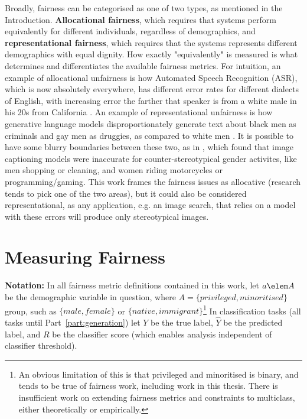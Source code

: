 Broadly, fairness can be categorised as one of two types, as mentioned in the Introduction. \textbf{Allocational fairness}, which requires that systems perform equivalently for different individuals, regardless of demographics, and \textbf{representational fairness}, which requires that the systems represents different demographics with equal dignity. How exactly "equivalently" is measured is what determines and differentiates the available fairness metrics. For intuition, an example of allocational unfairness is how Automated Speech Recognition (ASR), which is now absolutely everywhere, has different error rates for different dialects of English, with increasing error the farther that speaker is from a white male in his 20s from California \citep{tatman_2017}. An example of representational unfairness is how generative language models disproportionately generate text about black men as criminals and gay men as druggies, as compared to white men \citep{sheng-etal-2019-woman}. It is possible to have some blurry boundaries between these two, as in \citet{zhao-etal-2017-men}, which found that image captioning models were inaccurate for counter-stereotypical gender activites, like men shopping or cleaning, and women riding motorcycles or programming/gaming. This work frames the fairness issues as allocative (research tends to pick one of the two areas), but it could also be considered representational, as any application, e.g. an image search, that relies on a model with these errors will produce only stereotypical images.

\section{Measuring Fairness}
\label{sec:measuring_fairness}

\textbf{Notation:} In all fairness metric definitions contained in this work, let $a \elem A$ be the demographic variable in question, where $A = \{privileged, minoritised\}$ group, such as $\{male, female\}$ or $\{native, immigrant\}$\footnote{An obvious limitation of this is that privileged and minoritised is binary, and tends to be true of fairness work, including work in this thesis. There is insufficient work on extending fairness metrics and constraints to multiclass, either theoretically or empirically.} In classification tasks (all tasks until Part~\ref{part:generation}) let $Y$ be the true label, $\hat{Y}$ be the predicted label, and $R$ be the classifier score (which enables analysis independent of classifier threshold). 

